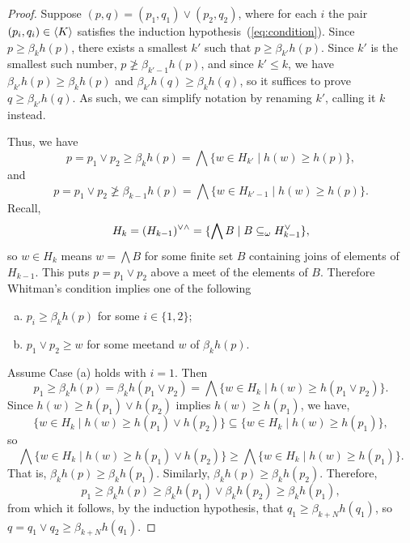 \begin{proof}
\bigskip

 Suppose 
$(p,q) = (p_1, q_1) \vee (p_2, q_2)$,
where for each $i$ the pair $(p_i, q_i) \in \langle K\rangle$ satisfies 
the induction hypothesis~(\ref{eq:condition}).
Since $p \geq \beta_kh(p)$, there exists a smallest $k'$ such that 
$p \geq \beta_{k'}h(p)$. Since $k'$ is the smallest such number,
$p \ngeq \beta_{k'-1}h(p)$, and since $k'\leq k$, we have
$\beta_{k'}h(p) \geq \beta_kh(p)$ 
and $\beta_{k'}h(q) \geq \beta_kh(q)$, so it suffices to prove
$q \geq \beta_{k'}h(q)$. As such, we can simplify notation
by renaming $k'$, calling it $k$ instead.

Thus,  we have
\[
p = p_1 \vee p_2 \geq \beta_{k}h(p) = \bigwedge \{w \in H_{k'} \mid h(w) \geq h(p)\},
\]
and
\begin{equation}\label{eq:contr}
p = p_1 \vee p_2 \ngeq \beta_{k-1}h(p) = \bigwedge \{w \in H_{k'-1} \mid h(w) \geq h(p)\}.
\end{equation}
Recall,
\[
H_{k} = (H_{k-1})^{\vee \wedge} = \{\bigwedge B \mid B \subseteq_{\omega} H_{k-1}^{\vee}\},
\]
so $w \in H_{k}$ means $w = \bigwedge B$ for some finite set $B$ containing 
joins of elements of $H_{k-1}$. This puts $p = p_1 \vee p_2$ above a meet of the 
elements of $B$.
Therefore Whitman's condition implies one of the following
\begin{enumerate}[(a)]
  \item $p_i \geq \beta_{k}h(p)$ for some $i \in \{1,2\}$;
  \item $p_1 \vee p_2 \geq w$ for some meetand $w$ of $\beta_{k}h(p)$.    
\end{enumerate}
Assume Case (a) holds with $i=1$. Then
\[
p_1 \geq \beta_{k}h(p)  = \beta_{k}h(p_1 \vee p_2)
= \bigwedge \{w \in H_{k} \mid h(w) \geq h(p_1 \vee p_2)\}.
\] 
Since $h(w) \geq h(p_1) \vee h(p_2)$ implies $h(w) \geq h(p_1)$, we have,
\[
\{w \in H_{k} \mid h(w) \geq h(p_1) \vee h(p_2)\}
\subseteq \{w \in H_{k} \mid h(w) \geq h(p_1)\},
\] 
so 
\[
\bigwedge \{w \in H_{k} \mid h(w) \geq h(p_1) \vee h(p_2)\}
\geq \bigwedge \{w \in H_{k} \mid h(w) \geq h(p_1)\}.
\]
That is, $\beta_{k}h(p) \geq \beta_{k}h(p_1)$.
Similarly, $\beta_{k}h(p) \geq \beta_{k}h(p_2)$. Therefore, 
\[
p_1 \geq \beta_{k}h(p)  \geq \beta_{k}h(p_1) \vee \beta_{k}h(p_2)
\geq \beta_{k}h(p_1),
\]
from which it follows, by the induction hypothesis, that 
$q_1 \geq \beta_{k+N}h(q_1)$, so 
$q = q_1 \vee q_2 \geq \beta_{k+N}h(q_1)$.

\bigskip


\end{proof}
